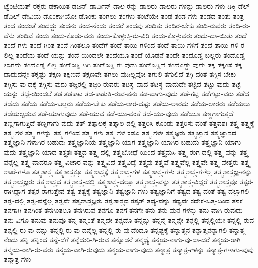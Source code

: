 {ಟ್ವೆಂಟಿಯತ್
ಠಕ್ಕರು
ಡಕಾಯಿತ
ಡಜನ್
ಡಾರ್ವಿನ್
ಡಾಲ-ರನ್ನು
ಡಾಲರು
ಡಾಲರು-ಗಳನ್ನು
ಡಾಲರು-ಗಳು
ಡಿಕ್ಕಿ
ಡೆಲ್
ಡೆವಿಲ್
ಡೇವಿಯ
ಡೊಂಕಾಗಿಯೋ
ಡೊಂಕು
ತಂಗಲು
ತಂಗಳು
ತಂಟೆಯೇ
ತಂಡ
ತಂಡ-ಗಳು
ತಂಡದ
ತಂತು
ತಂತ್ರ
ತಂದ
ತಂದಂತೆ
ತಂದದ್ದು
ತಂದನು
ತಂದ-ನೆಂದು
ತಂದರೆ
ತಂದವು
ತಂದಿತು
ತಂದಿರ-ಬೇಕು
ತಂದಿ-ರುವರು
ತಂದಿ-ರು-ವೆನು
ತಂದಿವೆ
ತಂದು
ತಂದು-ಕೊಡು-ವರು
ತಂದು-ಕೊಳ್ಳುತ್ತಿ-ರು-ವಿರಿ
ತಂದು-ಕೊಳ್ಳುವರು
ತಂದು-ದಾ-ಯಿತು
ತಂದೆ
ತಂದೆ-ಗಳು
ತಂದೆ-ಗಿಂತ
ತಂದೆ-ಗಿಂತಲೂ
ತಂದೆಗೆ
ತಂದೆ-ತಾಯಿ-ಗಳಿಂದ
ತಂದೆ-ತಾಯಿ-ಗಳಿಗೆ
ತಂದೆ-ತಾಯಿ-ಗಳಿ-ರ-ಲಿಲ್ಲ
ತಂದೆಯ
ತಂದೆ-ಯನ್ನು
ತಂದೆ-ಯಿಂದಲೇ
ತಂದೆಯೂ
ತಂದೆ-ಯೊಡನೆ
ತಂದೇ
ತಂದೊಡ್ಡ-ಬಲ್ಲರು
ತಂದೊಡ್ಡ-ಲಾರದು
ತಂದೊಡ್ಡ-ಲಿಲ್ಲ
ತಂದೊಡ್ಡಿ-ದಿರಿ
ತಂದೊಡ್ಡಿ-ರು-ವುದು
ತಂದೊಡ್ಡಿವೆ
ತಂದೊಡ್ಡು-ವುದು
ತಕ್ಕ
ತಕ್ಕಂತೆ
ತಕ್ಕ-ದಾದುದನ್ನೇ
ತಕ್ಕಷ್ಟು
ತಕ್ಷಣ
ತಕ್ಷಣವೆ
ತಕ್ಷಣವೇ
ತಗಲು-ವುದಿಲ್ಲವೋ
ತಗುಲಿ
ತಗುಲಿದೆ
ತಗ್ಗಿ-ದಂತೆ
ತಗ್ಗಿಸ-ಬೇಕು
ತಗ್ಗಿಸು-ವು-ದಕ್ಕೆ
ತಗ್ಗಿಸು-ವುದು
ತಜ್ಞರಲ್ಲಿ
ತಜ್ಞರಿ-ರುವರು
ತಟಸ್ಥ-ವಾದ
ತಟಸ್ಥ-ವಾದುದೇ
ತಟ್ಟಿದೆ
ತಟ್ಟು-ವುದು
ತಟ್ಟೆ-ಯನ್ನು
ತಟ್ಟೆ-ಯಿಂದಲೆ
ತಡ
ತಡಕಾಟ
ತಡ-ಕಾಡುತ್ತಿ-ರುವ-ವನು
ತಡ-ವಾಗು-ವುದು
ತಡೆ-ಗಟ್ಟಿ
ತಡೆಗಟ್ಟು-ವರು
ತಡೆದ
ತಡೆದು
ತಡೆಯ
ತಡೆಯ-ಬಲ್ಲರು
ತಡೆಯ-ಬೇಕು
ತಡೆಯ-ಲಾರ-ದಷ್ಟು
ತಡೆಯ-ಲಾರದು
ತಡೆಯ-ಲಾರರು
ತಡೆಯಲು
ತಡೆಯಲ್ಪಡುವ
ತಡೆ-ಯಾಗುವುದು
ತಡೆ-ಯುವ
ತಡೆ-ಯು-ವಂತೆ
ತಡೆ-ಯು-ವುದು
ತಡೆಯೂ
ತಣ್ಣಗಾಗುತ್ತದೆ
ತಣ್ಣಗಾಗುತ್ತಿದೆ
ತಣ್ಣಗಾಗು-ವುದು
ತತ್
ತತ್ಕಾಲಕ್ಕೆ
ತತ್ಕಾಲ-ದಲ್ಲಿ
ತತ್ತರಿಸಿ-ಕೊಂಡು
ತತ್ತರಿಸು-ವಂತೆ
ತತ್ತವಶಃ
ತತ್ತ್ವ
ತತ್ತ್ವಕ್ಕೆ
ತತ್ತ್ವ-ಗಳ
ತತ್ತ್ವ-ಗಳನ್ನು
ತತ್ತ್ವ-ಗಳಿಂದ
ತತ್ತ್ವ-ಗಳು
ತತ್ತ್ವ-ಗಳೆ-ರಡೂ
ತತ್ತ್ವ-ಗಳೇ
ತತ್ತ್ವಜ್ಞರು
ತತ್ತ್ವಜ್ಞಾನ
ತತ್ತ್ವಜ್ಞಾನದ
ತತ್ತ್ವಜ್ಞಾನಿ-ಗಳಾಗಿರ-ಬಹುದು
ತತ್ತ್ವಜ್ಞಾನಿಯ
ತತ್ತ್ವಜ್ಞಾನಿ-ಯಾಗ
ತತ್ತ್ವಜ್ಞಾನಿ-ಯಾಗಿರ-ಬಹುದು
ತತ್ತ್ವಜ್ಞಾನಿ-ಯಾಗು-ವುದು
ತತ್ತ್ವಜ್ಞಾನಿ-ಯಾದ
ತತ್ತ್ವತಃ
ತತ್ತ್ವದ
ತತ್ತ್ವ-ದಲ್ಲಿ
ತತ್ತ್ವಬೋಧೆ-ಯಿಂದ
ತತ್ತ್ವಮಸಿ
ತತ್ತ್ವ-ರಂಗ-ದಲ್ಲಿ
ತತ್ತ್ವ-ವನ್ನು
ತತ್ತ್ವ-ವನ್ನೆಲ್ಲ
ತತ್ತ್ವ-ವಾದರೂ
ತತ್ತ್ವ-ವಿಚಾರ-ವನ್ನು
ತತ್ತ್ವವಿದೆ
ತತ್ತ್ವವಿದ್ಯೆ
ತತ್ತ್ವವು
ತತ್ತ್ವವೆ
ತತ್ತ್ವವೆಲ್ಲ
ತತ್ತ್ವವೇ
ತತ್ತ್ವ-ವೇತ್ತರು
ತತ್ತ್ವ-ಶಾಖೆ-ಗಳೂ
ತತ್ತ್ವಶಾಸ್ತ್ರ
ತತ್ತ್ವಶಾಸ್ತ್ರಕ್ಕೂ
ತತ್ತ್ವಶಾಸ್ತ್ರಕ್ಕೆ
ತತ್ತ್ವಶಾಸ್ತ್ರ-ಗಳ
ತತ್ತ್ವಶಾಸ್ತ್ರ-ಗಳು
ತತ್ತ್ವಶಾಸ್ತ್ರ-ಗಳೆಲ್ಲ
ತತ್ತ್ವಶಾಸ್ತ್ರಜ್ಞ-ನನ್ನು
ತತ್ತ್ವಶಾಸ್ತ್ರಜ್ಞರು
ತತ್ತ್ವಶಾಸ್ತ್ರದ
ತತ್ತ್ವಶಾಸ್ತ್ರ-ದಲ್ಲಿ
ತತ್ತ್ವಶಾಸ್ತ್ರ-ದಲ್ಲೂ
ತತ್ತ್ವಶಾಸ್ತ್ರ-ವನ್ನು
ತತ್ತ್ವಶಾಸ್ತ್ರ-ವಿದ್ದರೆ
ತತ್ತ್ವಶಾಸ್ತ್ರವೂ
ತತ್ಪರ-ರಾಗಿದ್ದಾಗ
ತತ್ಪರ-ರಾಗುತ್ತೇವೆ
ತತ್ವ
ತತ್ವಕ್ಕೆ
ತತ್ವಜ್ಞಾನಿ
ತತ್ವಜ್ಞಾನಿ-ಗಳು
ತತ್ವಜ್ಞಾನಿಗೆ
ತತ್ವದ
ತತ್ವ-ದಂತೆ
ತತ್ವ-ದಲ್ಲಾಗಲಿ
ತತ್ವ-ದಲ್ಲಿ
ತತ್ವ-ವನ್ನೆಲ್ಲ
ತತ್ವವೇ
ತತ್ವಶಾಸ್ತ್ರಜ್ಞರು
ತತ್ವಶಾಸ್ತ್ರದ
ತತ್ಸತ್
ತಥ್ಯ-ವನ್ನು
ತಥ್ಯವೇ
ತದೇಕ-ಚಿತ್ತ-ದಿಂದ
ತನಕ
ತನಗಾಗಿ
ತನಗಿಂತ
ತನಗಿಂತಲೂ
ತನಗಿರುವ
ತನಗೂ
ತನಗೆ
ತನಗೇ
ತನು
ತನು-ಮನ-ಗಳನ್ನು
ತನು-ವಾಗಿ-ರುವುದು
ತನು-ವಿಗೂ
ತನುವು
ತನುವೂ
ತನ್ನ
ತನ್ನಂತೆ
ತನ್ನದೇ
ತನ್ನದೊ
ತನ್ನನ್ನು
ತನ್ನನ್ನೆ
ತನ್ನನ್ನೇ
ತನ್ನಲ್ಲಿ
ತನ್ನಲ್ಲಿಯೇ
ತನ್ನಲ್ಲಿ-ರುವ
ತನ್ನಲ್ಲಿ-ರು-ವು-ದನ್ನು
ತನ್ನಲ್ಲಿ-ರು-ವು-ದನ್ನೆಲ್ಲ
ತನ್ನಲ್ಲಿ-ರು-ವು-ದೆಂದೂ
ತನ್ನಷ್ಟಕ್ಕೆ
ತನ್ನಾತ್ಮನ
ತನ್ನಾತ್ಮನನ್ನಾಗಲಿ
ತನ್ನಾತ್ಮ-ನೆಂದು
ತನ್ನಿ
ತನ್ನಿಂದ
ತನ್ನೆ-ಡೆಗೆ
ತನ್ನೆದುರಿ-ಗಿ-ರುವ
ತನ್ನೊಡನೆ
ತನ್ಮಧ್ಯೆ
ತನ್ಮಯ-ನಾಗು-ವು-ದಾ-ದರೆ
ತನ್ಮಯ-ರಾಗಿ
ತನ್ಮಯ-ರಾಗಿ-ರು-ವರು
ತನ್ಮಯ-ವಾಗಿ-ರುವುದು
ತನ್ಮಯ-ವಾಗು-ವುದು
ತನ್ಮಾತ್ರ
ತನ್ಮಾತ್ರ-ಗಳನ್ನು
ತನ್ಮಾತ್ರ-ಗಳಾಗು-ವುವು
ತನ್ಮಾತ್ರ-ಗಳು
}
